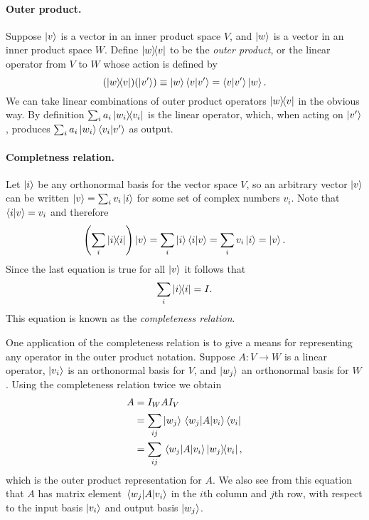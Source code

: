 \documentclass{article}
\begin{document}
\paragraph{Outer product.} Suppose $\ket{v}$ is a vector in an inner product
space $V$, and $\ket{w}$ is a vector in an inner product space $W$. Define
$\ketbra{w}{v}$ to be the \emph{outer product}, or the linear operator from $V$
to $W$ whose action is defined by \begin{equation}
  (\ketbra{w}{v})(\ket{v'}) \equiv \ket{w}\braket{v}{v'} = \braket{v}{v'}
    \ket{w}. \label{eq:out-prod}
\end{equation} We can take linear combinations of outer product operators
$\ketbra{w}{v}$ in the obvious way. By definition $\sum_i a_i
\ketbra{w_i}{v_i}$ is the linear operator, which, when acting on $\ket{v'}$,
produces $\sum_i a_i\ket{w_i} \braket{v_i}{v'}$ as output.

\paragraph{Completness relation.} Let $\ket{i}$ be any orthonormal basis for
the vector space $V$, so an arbitrary vector $\ket{v}$ can be written $\ket{v}
= \sum_i v_i\ket{i}$ for some set of complex numbers $v_i$. Note that
$\braket{i}{v} = v_i$ and therefore \begin{equation*}
  \left(\sum_i \ketbra{i}{i}\right)\ket{v} = \sum_i \ket{i}\braket{i}{v} =
    \sum_i v_i\ket{i} = \ket{v}.
\end{equation*} Since the last equation is true for all $\ket{v}$ it follows
that \begin{equation} \label{eq:comp-rel}
  \sum_i \ketbra{i}{i} = I.
\end{equation} This equation is known as the \emph{completeness relation}.

One application of the completeness relation is to give a means for
representing any operator in the outer product notation. Suppose $A : V
\rightarrow W$ is a linear operator, $\ket{v_i}$ is an orthonormal basis for
$V$, and $\ket{w_j}$ an orthonormal basis for $W$. Using the completeness
relation twice we obtain \begin{align}
  A &= I_WAI_V \nonumber \\
    &= \sum_{ij} \ket{w_j}\mel{w_j}{A}{v_i}\bra{v_i} \nonumber \\
    &= \sum_{ij} \mel{w_j}{A}{v_i}\ketbra{w_j}{v_i}, \label{eq:out-prod-rep}
\end{align} which is the outer product representation for $A$. We also see from
this equation that $A$ has matrix element $\mel{w_j}{A}{v_i}$ in the $i$th
column and $j$th row, with respect to the input basis $\ket{v_i}$ and output
basis $\ket{w_j}$.
\end{document}
